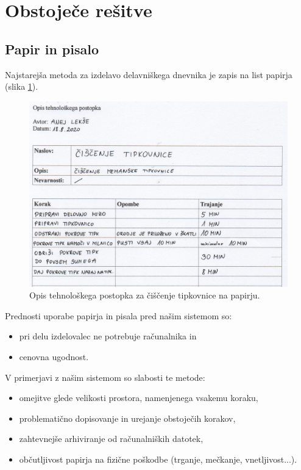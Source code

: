\documentclass[a4paper, 12pt]{book}
\begin{document}
\section{Obstoječe rešitve}



\subsection{Papir in pisalo}

Najstarejša metoda za izdelavo delavniškega dnevnika je zapis na list papirja (slika \ref{paper}).

\begin{figure}[H]
\begin{center}
\includegraphics[width=13.5cm]{report_paper_small}
\end{center}
\caption{Opis tehnološkega postopka za čiščenje tipkovnice na papirju.}
\label{paper}
\end{figure}


\noindent Prednosti uporabe papirja in pisala pred našim sistemom so:
\begin{itemize}
	\item pri delu izdelovalec ne potrebuje računalnika in
	\item cenovna ugodnost.
\end{itemize}
V primerjavi z našim sistemom so slabosti te metode:
\begin{itemize}
	\item omejitve glede velikosti prostora, namenjenega vsakemu koraku,
	\item problematično dopisovanje in urejanje obstoječih korakov,
	\item zahtevnejše arhiviranje od računalniških datotek,
	\item občutljivost papirja na fizične poškodbe (trganje, mečkanje, vnetljivost...).
\end{itemize}
\end{document}

